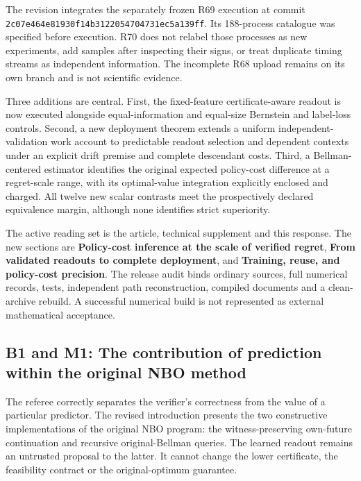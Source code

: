 \documentclass[ecta,nameyear,draft]{econsocart}
\begin{document}
The revision integrates the separately frozen R69 execution at commit
\nolinkurl{2c07e464e81930f14b3122054704731ec5a139ff}. Its 188-process
catalogue was specified before execution. R70 does not relabel those
processes as new experiments, add samples after inspecting their signs,
or treat duplicate timing streams as independent information. The
incomplete R68 upload remains on its own branch and is not scientific
evidence.

Three additions are central. First, the fixed-feature certificate-aware
readout is now executed alongside equal-information and equal-size
Bernstein and label-loss controls. Second, a new deployment theorem
extends a uniform independent-validation work account to predictable
readout selection and dependent contexts under an explicit drift premise
and complete descendant costs. Third, a Bellman-centered estimator
identifies the original expected policy-cost difference at a
regret-scale range, with its optimal-value integration explicitly
enclosed and charged. All twelve new scalar contrasts meet the
prospectively declared equivalence margin, although none identifies
strict superiority.

The active reading set is the article, technical supplement and this
response. The new sections are \textbf{Policy-cost inference at the
scale of verified regret}, \textbf{From validated readouts to complete
deployment}, and \textbf{Training, reuse, and policy-cost precision}.
The release audit binds ordinary sources, full numerical records, tests,
independent path reconstruction, compiled documents and a clean-archive
rebuild. A successful numerical build is not represented as external
mathematical acceptance.

\hypertarget{b1-and-m1-the-contribution-of-prediction-within-the-original-nbo-method}{%
\subsection{B1 and M1: The contribution of prediction within the
original NBO
method}\label{b1-and-m1-the-contribution-of-prediction-within-the-original-nbo-method}}

The referee correctly separates the verifier's correctness from the
value of a particular predictor. The revised introduction presents the
two constructive implementations of the original NBO program: the
witness-preserving own-future continuation and recursive
original-Bellman queries. The learned readout remains an untrusted
proposal to the latter. It cannot change the lower certificate, the
feasibility contract or the original-optimum guarantee.
\end{document}
